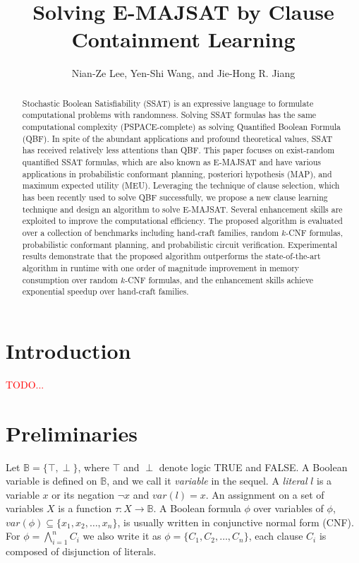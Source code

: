 \documentclass{llncs}
\title{Solving E-MAJSAT by Clause Containment Learning}
\author{Nian-Ze Lee, Yen-Shi Wang, and Jie-Hong R. Jiang}
\institute{
Department of Electrical Engineering / Graduate Institute of Electronics Engineering\\
National Taiwan University, Taipei 10617, Taiwan\\
\email{}}
\begin{document}
\maketitle
\begin{abstract}
Stochastic Boolean Satisfiability (SSAT) is an expressive language to formulate computational problems with randomness. Solving SSAT formulas has the same computational complexity (PSPACE-complete) as solving Quantified Boolean Formula (QBF). In spite of the abundant applications and profound theoretical values, SSAT has received relatively less attentions than QBF. This paper focuses on exist-random quantified SSAT formulas, which are also known as E-MAJSAT and have various applications in probabilistic conformant planning, posteriori hypothesis (MAP), and maximum expected utility (MEU). Leveraging the technique of clause selection, which has been recently used to solve QBF successfully, we propose a new clause learning technique and design an algorithm to solve E-MAJSAT. Several enhancement skills are exploited to improve the computational efficiency. The proposed algorithm is evaluated over a collection of benchmarks including hand-craft families, random $k$-CNF formulas, probabilistic conformant planning, and probabilistic circuit verification. Experimental results demonstrate that the proposed algorithm outperforms the state-of-the-art algorithm in runtime with one order of magnitude improvement in memory consumption over random $k$-CNF formulas, and the enhancement skills achieve exponential speedup over hand-craft families.
\end{abstract}

\section{Introduction}\label{sec:intro}
\textcolor{red}{TODO...}

\section{Preliminaries}\label{sec:preli}
Let $\mathbb{B} = \{\top, \perp\}$, where $\top$ and $\perp$ denote logic TRUE and FALSE. A Boolean variable is defined on $\mathbb{B}$, and we call it {\it variable} in the sequel. A {\it literal} $l$ is a variable $x$ or its negation $\neg x$ and $var(l)=x$. An assignment on a set of variables $X$ is a function $\tau:X \rightarrow \mathbb{B}$. A Boolean formula $\phi$ over variables of $\phi$, $var(\phi) \subseteq \{x_1, x_2, \ldots, x_n\}$, is usually written in conjunctive normal form (CNF). For $\phi = \bigwedge_{i=1}^{n} C_i$ we also write it as $\phi = \{C_1, C_2, \ldots, C_n\}$, each clause $C_i$ is composed of disjunction of literals.
\end{document}
